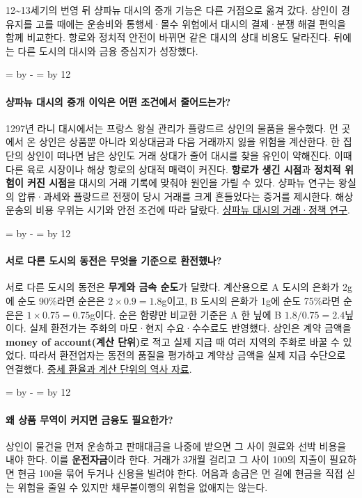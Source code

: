 \documentclass[10pt,a4paper]{article}
\newcommand{\ReserveQuestionSpace}{%
  \par\begingroup
  \dimen0=\pagegoal \advance\dimen0 by -\pagetotal
  \dimen2=\baselineskip \multiply\dimen2 by 12
  \ifdim\dimen0<\dimen2 \newpage\fi
  \endgroup}
\begin{document}
12\textasciitilde{}13세기의 번영 뒤 샹파뉴 대시의 중개 기능은 다른 거점으로 옮겨 갔다. 상인이 경유지를 고를 때에는 운송비와 통행세·몰수 위험에서 대시의 결제·분쟁 해결 편익을 함께 비교한다. 항로와 정치적 안전이 바뀌면 같은 대시의 상대 비용도 달라진다. 뒤에는 다른 도시의 대시와 금융 중심지가 성장했다.\par

\ReserveQuestionSpace
\paragraph{샹파뉴 대시의 중개 이익은 어떤 조건에서 줄어드는가?}
1297년 라니 대시에서는 프랑스 왕실 관리가 플랑드르 상인의 물품을 몰수했다. 먼 곳에서 온 상인은 상품뿐 아니라 외상대금과 다음 거래까지 잃을 위험을 계산한다. 한 집단의 상인이 떠나면 남은 상인도 거래 상대가 줄어 대시를 찾을 유인이 약해진다. 이때 다른 육로 시장이나 해상 항로의 상대적 매력이 커진다. \textbf{항로가 생긴 시점}과 \textbf{정치적 위험이 커진 시점}을 대시의 거래 기록에 맞춰야 원인을 가릴 수 있다. 샹파뉴 연구는 왕실의 압류·과세와 플랑드르 전쟁이 당시 거래를 크게 흔들었다는 증거를 제시한다. 해상 운송의 비용 우위는 시기와 안전 조건에 따라 달랐다. \href{https://sheilaghogilvie.com/wp-content/uploads/publications/Edwards-Ogilvie-2012-Champagne-Fairs.pdf}{샹파뉴 대시의 거래·정책 연구}.\par

\ReserveQuestionSpace
\paragraph{서로 다른 도시의 동전은 무엇을 기준으로 환전했나?}
서로 다른 도시의 동전은 \textbf{무게와 금속 순도}가 달랐다. 계산용으로 A 도시의 은화가 2g에 순도 90\%라면 순은은 $2\times0.9=1.8$g이고, B 도시의 은화가 1g에 순도 75\%라면 순은은 $1\times0.75=0.75$g이다. 순은 함량만 비교한 기준은 A 한 닢에 B $1.8/0.75=2.4$닢이다. 실제 환전가는 주화의 마모·현지 수요·수수료도 반영했다. 상인은 계약 금액을 \textbf{money of account(계산 단위)}로 적고 실제 지급 때 여러 지역의 주화로 바꿀 수 있었다. 따라서 환전업자는 동전의 품질을 평가하고 계약상 금액을 실제 지급 수단으로 연결했다. \href{https://memdb.libraries.rutgers.edu/node/322217}{중세 환율과 계산 단위의 역사 자료}.\par

\ReserveQuestionSpace
\paragraph{왜 상품 무역이 커지면 금융도 필요한가?}
상인이 물건을 먼저 운송하고 판매대금을 나중에 받으면 그 사이 원료와 선박 비용을 내야 한다. 이를 \textbf{운전자금}이라 한다. 거래가 3개월 걸리고 그 사이 100의 지출이 필요하면 현금 100을 묶어 두거나 신용을 빌려야 한다. 어음과 송금은 먼 길에 현금을 직접 싣는 위험을 줄일 수 있지만 채무불이행의 위험을 없애지는 않는다.\par
\end{document}

